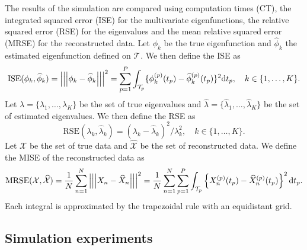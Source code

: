 \documentclass[times,sort&compress,3p]{elsarticle}
\theoremstyle{plain}%
\theoremstyle{definition}
\newcommand{\dd}{{\rm d}}
\newcommand{\TT}[1]{\mathcal{T}_{#1}} %
\newcommand{\normH}[1]{\left|\left|\left|#1\right|\right|\right|}
\newcommand{\Xnp}{X_n^{(p)}} %
\newcommand{\hatXnp}[1]{\widehat{X}_n^{(#1)}} %
\begin{document}
The results of the simulation are compared using computation times (CT), the integrated squared error (ISE) for the multivariate eigenfunctions, the relative squared error (RSE) for the eigenvalues and the mean relative squared error (MRSE) for the reconstructed data. Let $\phi_k$ be the true eigenfunction and $\widehat{\phi}_k$ the estimated eigenfunction defined on $\TT{}$. We then define the ISE as 
\begin{equation}\label{eq:ise_eigenfunctions}
    \text{ISE}(\phi_k, \widehat{\phi}_k) = \normH{\phi_k - \widehat{\phi}_k}^2 = \sum_{p = 1}^P \int_{\TT{p}} \{\phi^{(p)}_k(t_p) - \widehat{\phi}^{(p)}_k(t_p)\}^2 \dd t_p, \quad k \in \{1, \dots, K\}.
\end{equation}
Let $\lambda = \{\lambda_1, \dots, \lambda_K\}$ be the set of true eigenvalues and $\widehat{\lambda} = \{\widehat{\lambda}_1, \dots, \widehat{\lambda}_K\}$ be the set of estimated eigenvalues. We then define the RSE as 
\begin{equation}\label{eq:mse_eigenvalues}
    \text{RSE}(\lambda_k, \widehat{\lambda}_k) = \left(\lambda_k - \widehat{\lambda}_k\right)^2 / \lambda_k^2, \quad k \in \{1, \dots, K\}.
\end{equation}
Let $\mathcal{X}$ be the set of true data and $\widehat{\mathcal{X}}$ be the set of reconstructed data. We define the MISE of the reconstructed data as
\begin{equation}\label{eq:mise_reconstructed_data}
    \text{MRSE}(\mathcal{X}, \widehat{\mathcal{X}}) = \frac{1}{N}\sum_{n = 1}^N \normH{X_n - \widehat{X}_n}^2 = \frac{1}{N}\sum_{n = 1}^N \sum_{p = 1}^P \int_{\TT{p}} \left\{\Xnp(t_p) - \hatXnp{p}(t_p) \right\}^2 \dd t_p.
\end{equation}
Each integral is approximated by the trapezoidal rule with an equidistant grid.

\subsection{Simulation experiments} %
\label{sub:simulation_experiments}
\end{document}
